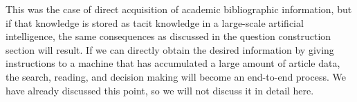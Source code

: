 \documentclass{book}
\begin{document}
This was the case of direct acquisition of academic bibliographic information, but if that knowledge is stored as tacit knowledge in a large-scale artificial intelligence, the same consequences as discussed in the question construction section will result. If we can directly obtain the desired information by giving instructions to a machine that has accumulated a large amount of article data, the search, reading, and decision making will become an end-to-end process. We have already discussed this point, so we will not discuss it in detail here.




\end{document}
